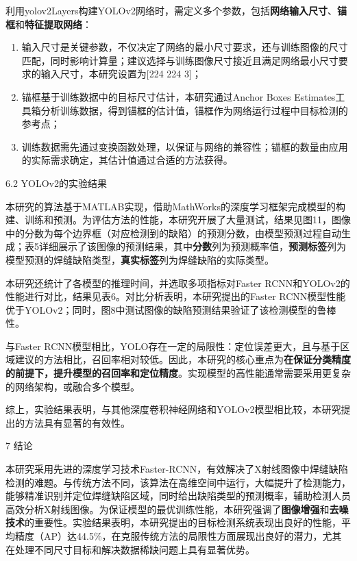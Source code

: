 利用yolov2Layers构建YOLOv2网络时，需定义多个参数，包括\textbf{网络输入尺寸}、\textbf{锚框}和\textbf{特征提取网络}：

\begin{enumerate}
	\def\labelenumi{\arabic{enumi}.}
	\item
	输入尺寸是关键参数，不仅决定了网络的最小尺寸要求，还与训练图像的尺寸匹配，同时影响计算量；建议选择与训练图像尺寸接近且满足网络最小尺寸要求的输入尺寸，本研究设置为{[}224
	224 3{]}；
	\item
	锚框基于训练数据中的目标尺寸估计，本研究通过Anchor Boxes
	Estimates工具箱分析训练数据，得到锚框的估计值，锚框作为网络运行过程中目标检测的参考点；
	\item
	训练数据需先通过变换函数处理，以保证与网络的兼容性；锚框的数量由应用的实际需求确定，其估计值通过合适的方法获得。
\end{enumerate}

6.2 YOLOv2的实验结果

本研究的算法基于MATLAB实现，借助MathWorks的深度学习框架完成模型的构建、训练和预测。为评估方法的性能，本研究开展了大量测试，结果见图11，图像中的分数为每个边界框（对应检测到的缺陷）的预测分数，由模型预测过程自动生成；表5详细展示了该图像的预测结果，其中\textbf{分数}列为预测概率值，\textbf{预测标签}列为模型预测的焊缝缺陷类型，\textbf{真实标签}列为焊缝缺陷的实际类型。

本研究还统计了各模型的推理时间，并选取多项指标对Faster
RCNN和YOLOv2的性能进行对比，结果见表6。对比分析表明，本研究提出的Faster
RCNN模型性能优于YOLOv2；同时，图8中测试图像的缺陷预测结果验证了该检测模型的鲁棒性。

与Faster
RCNN模型相比，YOLO存在一定的局限性：定位误差更大，且与基于区域建议的方法相比，召回率相对较低。因此，本研究的核心重点为\textbf{在保证分类精度的前提下，提升模型的召回率和定位精度}。实现模型的高性能通常需要采用更复杂的网络架构，或融合多个模型。

综上，实验结果表明，与其他深度卷积神经网络和YOLOv2模型相比较，本研究提出的方法具有显著的有效性。

7 结论

本研究采用先进的深度学习技术Faster-RCNN，有效解决了X射线图像中焊缝缺陷检测的难题。与传统方法不同，该算法在高维空间中运行，大幅提升了检测能力，能够精准识别并定位焊缝缺陷区域，同时给出缺陷类型的预测概率，辅助检测人员高效分析X射线图像。为保证模型的最优训练性能，本研究强调了\textbf{图像增强}和\textbf{去噪技术}的重要性。实验结果表明，本研究提出的目标检测系统表现出良好的性能，平均精度（AP）达44.5\%，在克服传统方法的局限性方面展现出良好的潜力，尤其在处理不同尺寸目标和解决数据稀缺问题上具有显著优势。

